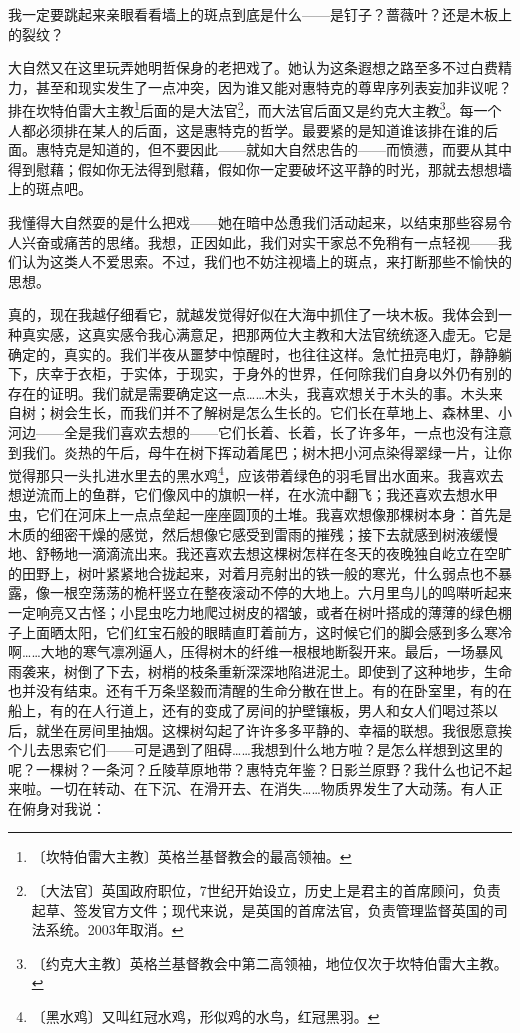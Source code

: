 \documentclass[12pt,UTF-8,openany]{ctexbook}
\begin{document}
\begin{large}
    我一定要跳起来亲眼看看墙上的斑点到底是什么——是钉子？蔷薇叶？还是木板上的裂纹？
    
    大自然又在这里玩弄她明哲保身的老把戏了。她认为这条遐想之路至多不过白费精力，甚至和现实发生了一点冲突，因为谁又能对惠特克的尊卑序列表妄加非议呢？排在坎特伯雷大主教\footnote{〔坎特伯雷大主教〕英格兰基督教会的最高领袖。}后面的是大法官\footnote{〔大法官〕英国政府职位，7世纪开始设立，历史上是君主的首席顾问，负责起草、签发官方文件；现代来说，是英国的首席法官，负责管理监督英国的司法系统。2003年取消。}，而大法官后面又是约克大主教\footnote{〔约克大主教〕英格兰基督教会中第二高领袖，地位仅次于坎特伯雷大主教。}。每一个人都必须排在某人的后面，这是惠特克的哲学。最要紧的是知道谁该排在谁的后面。惠特克是知道的，但不要因此——就如大自然忠告的——而愤懑，而要从其中得到慰藉；假如你无法得到慰藉，假如你一定要破坏这平静的时光，那就去想想墙上的斑点吧。
    
    我懂得大自然耍的是什么把戏——她在暗中怂恿我们活动起来，以结束那些容易令人兴奋或痛苦的思绪。我想，正因如此，我们对实干家总不免稍有一点轻视——我们认为这类人不爱思索。不过，我们也不妨注视墙上的斑点，来打断那些不愉快的思想。
    
    真的，现在我越仔细看它，就越发觉得好似在大海中抓住了一块木板。我体会到一种真实感，这真实感令我心满意足，把那两位大主教和大法官统统逐入虚无。它是确定的，真实的。我们半夜从噩梦中惊醒时，也往往这样。急忙扭亮电灯，静静躺下，庆幸于衣柜，于实体，于现实，于身外的世界，任何除我们自身以外仍有别的存在的证明。我们就是需要确定这一点……木头，我喜欢想关于木头的事。木头来自树；树会生长，而我们并不了解树是怎么生长的。它们长在草地上、森林里、小河边——全是我们喜欢去想的——它们长着、长着，长了许多年，一点也没有注意到我们。炎热的午后，母牛在树下挥动着尾巴；树木把小河点染得翠绿一片，让你觉得那只一头扎进水里去的黑水鸡\footnote{〔黑水鸡〕又叫红冠水鸡，形似鸡的水鸟，红冠黑羽。}，应该带着绿色的羽毛冒出水面来。我喜欢去想逆流而上的鱼群，它们像风中的旗帜一样，在水流中翻飞；我还喜欢去想水甲虫，它们在河床上一点点垒起一座座圆顶的土堆。我喜欢想像那棵树本身：首先是木质的细密干燥的感觉，然后想像它感受到雷雨的摧残；接下去就感到树液缓慢地、舒畅地一滴滴流出来。我还喜欢去想这棵树怎样在冬天的夜晚独自屹立在空旷的田野上，树叶紧紧地合拢起来，对着月亮射出的铁一般的寒光，什么弱点也不暴露，像一根空荡荡的桅杆竖立在整夜滚动不停的大地上。六月里鸟儿的鸣啭听起来一定响亮又古怪；小昆虫吃力地爬过树皮的褶皱，或者在树叶搭成的薄薄的绿色棚子上面晒太阳，它们红宝石般的眼睛直盯着前方，这时候它们的脚会感到多么寒冷啊……大地的寒气凛冽逼人，压得树木的纤维一根根地断裂开来。最后，一场暴风雨袭来，树倒了下去，树梢的枝条重新深深地陷进泥土。即使到了这种地步，生命也并没有结束。还有千万条坚毅而清醒的生命分散在世上。有的在卧室里，有的在船上，有的在人行道上，还有的变成了房间的护壁镶板，男人和女人们喝过茶以后，就坐在房间里抽烟。这棵树勾起了许许多多平静的、幸福的联想。我很愿意挨个儿去思索它们——可是遇到了阻碍……我想到什么地方啦？是怎么样想到这里的呢？一棵树？一条河？丘陵草原地带？惠特克年鉴？日影兰原野？我什么也记不起来啦。一切在转动、在下沉、在滑开去、在消失……物质界发生了大动荡。有人正在俯身对我说：
    

\end{large}
\end{document}
